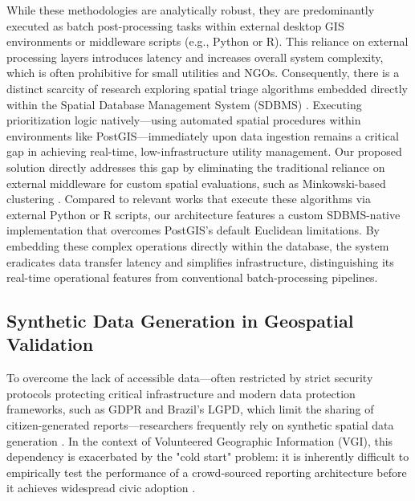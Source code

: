 \documentclass[conference]{IEEEtran}
\renewcommand\hl[1]{#1}
\begin{document}
While these methodologies are analytically robust, they are predominantly executed as batch post-processing tasks within external desktop GIS environments or middleware scripts (e.g., Python or R). This reliance on external processing layers introduces latency and increases overall system complexity, which is often prohibitive for small utilities and NGOs. Consequently, there is a distinct scarcity of research exploring spatial triage algorithms embedded directly within the Spatial Database Management System (SDBMS) \cite{obe2021}. Executing prioritization logic natively—using automated spatial procedures within environments like PostGIS—immediately upon data ingestion remains a critical gap in achieving real-time, low-infrastructure utility management. \hl{Our proposed solution directly addresses this gap by eliminating the traditional reliance on external middleware for custom spatial evaluations, such as Minkowski-based clustering \cite{haviluddin2020, karo2025}. Compared to relevant works that execute these algorithms via external Python or R scripts, our architecture features a custom SDBMS-native implementation that overcomes PostGIS's default Euclidean limitations. By embedding these complex operations directly within the database, the system eradicates data transfer latency and simplifies infrastructure, distinguishing its real-time operational features from conventional batch-processing pipelines.}

\subsection{Synthetic Data Generation in Geospatial Validation}

To overcome the lack of accessible data---\hl{often restricted by strict security protocols protecting critical infrastructure and modern data protection frameworks, such as GDPR and Brazil's LGPD, which limit the sharing of citizen-generated reports}---researchers frequently rely on synthetic spatial data generation \cite{mody2023}. In the context of Volunteered Geographic Information (VGI), this dependency is exacerbated by the "cold start" problem: it is inherently difficult to empirically test the performance of a crowd-sourced reporting architecture before it achieves widespread civic adoption \cite{mazzoleni2019}.
\end{document}
